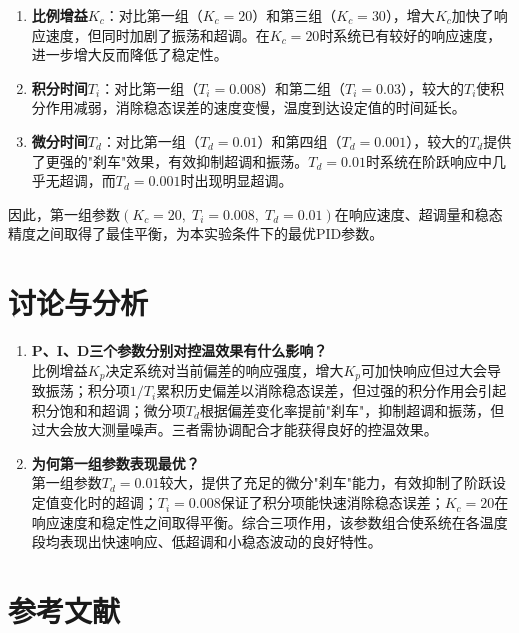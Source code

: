\documentclass[a4paper,8pt,twocolumn]{article}
\begin{document}
\begin{enumerate}
  \item \textbf{比例增益$K_c$}：对比第一组（$K_c=20$）和第三组（$K_c=30$），增大$K_c$加快了响应速度，但同时加剧了振荡和超调。在$K_c=20$时系统已有较好的响应速度，进一步增大反而降低了稳定性。

  \item \textbf{积分时间$T_i$}：对比第一组（$T_i=0.008$）和第二组（$T_i=0.03$），较大的$T_i$使积分作用减弱，消除稳态误差的速度变慢，温度到达设定值的时间延长。

  \item \textbf{微分时间$T_d$}：对比第一组（$T_d=0.01$）和第四组（$T_d=0.001$），较大的$T_d$提供了更强的"刹车"效果，有效抑制超调和振荡。$T_d=0.01$时系统在阶跃响应中几乎无超调，而$T_d=0.001$时出现明显超调。
\end{enumerate}

因此，第一组参数$(K_c=20,\;T_i=0.008,\;T_d=0.01)$在响应速度、超调量和稳态精度之间取得了最佳平衡，为本实验条件下的最优PID参数。

\section{讨论与分析}

\begin{enumerate}
  \item \textbf{P、I、D三个参数分别对控温效果有什么影响？}\\[0.3em]
  比例增益$K_p$决定系统对当前偏差的响应强度，增大$K_p$可加快响应但过大会导致振荡；积分项$1/T_i$累积历史偏差以消除稳态误差，但过强的积分作用会引起积分饱和和超调；微分项$T_d$根据偏差变化率提前"刹车"，抑制超调和振荡，但过大会放大测量噪声。三者需协调配合才能获得良好的控温效果。

  \item \textbf{为何第一组参数表现最优？}\\[0.3em]
  第一组参数$T_d=0.01$较大，提供了充足的微分"刹车"能力，有效抑制了阶跃设定值变化时的超调；$T_i=0.008$保证了积分项能快速消除稳态误差；$K_c=20$在响应速度和稳定性之间取得平衡。综合三项作用，该参数组合使系统在各温度段均表现出快速响应、低超调和小稳态波动的良好特性。
\end{enumerate}

\clearpage
\onecolumn
\section*{参考文献}
\end{document}
